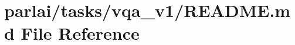 \hypertarget{parlai_2tasks_2vqa__v1_2README_8md}{}\section{parlai/tasks/vqa\+\_\+v1/\+R\+E\+A\+D\+ME.md File Reference}
\label{parlai_2tasks_2vqa__v1_2README_8md}
